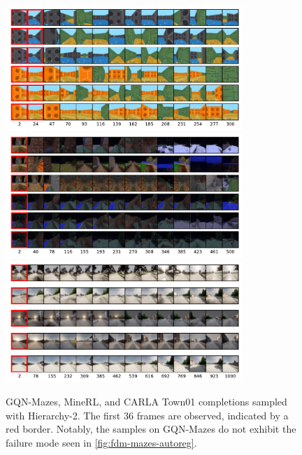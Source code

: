 \begin{figure}[b]
    \centering
    \includegraphics[width=0.8\textwidth]{figs/fdm/mazes-cond.pdf}
    \includegraphics[width=0.8\textwidth]{figs/fdm/minerl-cond.pdf}
    \includegraphics[width=0.8\textwidth]{figs/fdm/carla-cond.pdf}
    \caption{GQN-Mazes, MineRL, and CARLA Town01 completions sampled with Hierarchy-2. The first 36 frames are observed, indicated by a red border. Notably, the samples on GQN-Mazes do not exhibit the failure mode seen in \cref{fig:fdm-mazes-autoreg}.}
    \label{fig:fdm-all-cond}
\end{figure}

